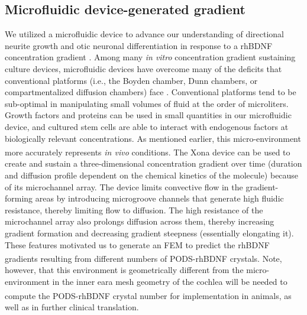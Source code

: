 \documentclass[review]{elsarticle}
\begin{document}
\subsection{Microfluidic device-generated gradient}
We utilized a microfluidic device to advance our understanding of directional neurite growth and otic neuronal differentiation in response to a rhBDNF concentration gradient \cite{dravid2020}. Among many \textit{in vitro} concentration gradient sustaining culture devices, microfluidic devices have overcome many of the deficits that conventional platforms (i.e., the Boyden chamber, Dunn chambers, or compartmentalized diffusion chambers) face \cite{dravid2020}. Conventional platforms tend to be sub-optimal in manipulating small volumes of fluid at the order of microliters. Growth factors and proteins can be used in small quantities in our microfluidic device, and cultured stem cells are able to interact with endogenous factors at biologically relevant concentrations. As mentioned earlier, this micro-environment more accurately represents \textit{in vivo} conditions. The Xona\textsuperscript{\texttrademark} device can be used to create and sustain a three-dimensional concentration gradient over time (duration and diffusion profile dependent on the chemical kinetics of the molecule) because of its microchannel array.  The device limits convective flow in the gradient-forming areas by introducing microgroove channels that generate high fluidic resistance, thereby limiting flow to diffusion. The high resistance of the microchannel array also prolongs diffusion across them, thereby increasing gradient formation and decreasing gradient steepness (essentially elongating it). These features motivated us to generate an FEM to predict the rhBDNF gradients resulting from different numbers of PODS\textsuperscript{\textregistered}-rhBDNF crystals. Note, however, that this environment is geometrically different from the micro-environment in the inner ear\textendash a mesh geometry of the cochlea will be needed to compute the PODS\textsuperscript{\textregistered}-rhBDNF crystal number for implementation in animals, as well as in further clinical translation. 
\end{document}
